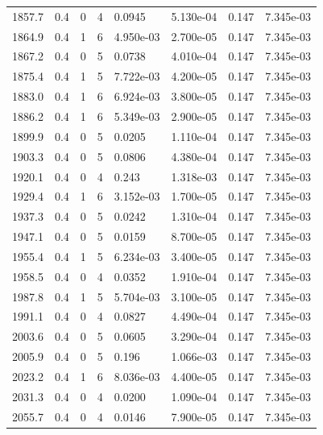 \documentclass[preview]{standalone}
\begin{document}
{{{{{{\begin{tabular}{L{1.2cm}C{1.2cm} C{0.3cm}C{0.5cm} C{1.4cm}C{1.4cm} C{1.4cm}C{1.4cm}}
  1857.7  &   0.4  & 0     &  4 &  0.0945  & 5.130e-04  & 0.147 &  7.345e-03   \\ 
  1864.9  &   0.4  & 1     &  6 &  4.950e-03  & 2.700e-05  & 0.147 &  7.345e-03   \\ 
  1867.2  &   0.4  & 0     &  5 &  0.0738  & 4.010e-04  & 0.147 &  7.345e-03   \\ 
  1875.4  &   0.4  & 1     &  5 &  7.722e-03  & 4.200e-05  & 0.147 &  7.345e-03   \\ 
  1883.0  &   0.4  & 1     &  6 &  6.924e-03  & 3.800e-05  & 0.147 &  7.345e-03   \\ 
  1886.2  &   0.4  & 1     &  6 &  5.349e-03  & 2.900e-05  & 0.147 &  7.345e-03   \\ 
  1899.9  &   0.4  & 0     &  5 &  0.0205  & 1.110e-04  & 0.147 &  7.345e-03   \\ 
  1903.3  &   0.4  & 0     &  5 &  0.0806  & 4.380e-04  & 0.147 &  7.345e-03   \\ 
  1920.1  &   0.4  & 0     &  4 &  0.243  & 1.318e-03  & 0.147 &  7.345e-03   \\ 
  1929.4  &   0.4  & 1     &  6 &  3.152e-03  & 1.700e-05  & 0.147 &  7.345e-03   \\ 
  1937.3  &   0.4  & 0     &  5 &  0.0242  & 1.310e-04  & 0.147 &  7.345e-03   \\ 
  1947.1  &   0.4  & 0     &  5 &  0.0159  & 8.700e-05  & 0.147 &  7.345e-03   \\ 
  1955.4  &   0.4  & 1     &  5 &  6.234e-03  & 3.400e-05  & 0.147 &  7.345e-03   \\ 
  1958.5  &   0.4  & 0     &  4 &  0.0352  & 1.910e-04  & 0.147 &  7.345e-03   \\ 
  1987.8  &   0.4  & 1     &  5 &  5.704e-03  & 3.100e-05  & 0.147 &  7.345e-03   \\ 
  1991.1  &   0.4  & 0     &  4 &  0.0827  & 4.490e-04  & 0.147 &  7.345e-03   \\ 
  2003.6  &   0.4  & 0     &  5 &  0.0605  & 3.290e-04  & 0.147 &  7.345e-03   \\ 
  2005.9  &   0.4  & 0     &  5 &  0.196  & 1.066e-03  & 0.147 &  7.345e-03   \\ 
  2023.2  &   0.4  & 1     &  6 &  8.036e-03  & 4.400e-05  & 0.147 &  7.345e-03   \\ 
  2031.3  &   0.4  & 0     &  4 &  0.0200  & 1.090e-04  & 0.147 &  7.345e-03   \\ 
  2055.7  &   0.4  & 0     &  4 &  0.0146  & 7.900e-05  & 0.147 &  7.345e-03   \\ 

\end{tabular}}}}}}}
\end{document}
